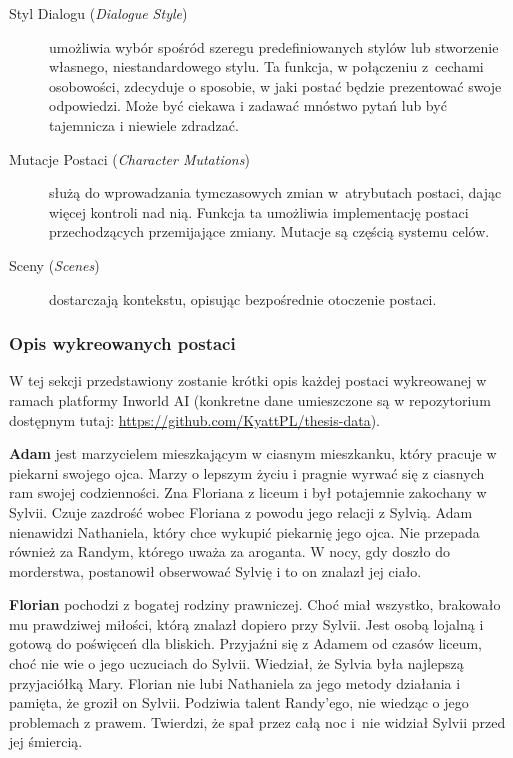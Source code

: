 \begin{description}
    \item[Styl Dialogu (\textit{Dialogue Style})] umożliwia wybór spośród szeregu predefiniowanych stylów lub stworzenie
          własnego, niestandardowego stylu. Ta funkcja, w połączeniu z~cechami osobowości, zdecyduje o
          sposobie, w jaki postać będzie prezentować swoje odpowiedzi. Może być ciekawa i zadawać mnóstwo pytań
          lub być tajemnicza i niewiele zdradzać\cite{inworld_docs}.

    \item[Mutacje Postaci (\textit{Character Mutations})] służą do wprowadzania tymczasowych zmian w~atrybutach
          postaci, dając więcej kontroli nad nią. Funkcja ta umożliwia implementację postaci przechodzących
          przemijające zmiany. Mutacje są częścią systemu celów\cite{inworld_docs}.

    \item[Sceny (\textit{Scenes})] dostarczają kontekstu, opisując bezpośrednie otoczenie postaci\cite{inworld_docs}.

\end{description}

\subsubsection*{Opis wykreowanych postaci}

W tej sekcji przedstawiony zostanie krótki opis każdej postaci wykreowanej w ramach platformy Inworld AI
(konkretne dane umieszczone są w repozytorium dostępnym tutaj: \href{https://github.com/KyattPL/thesis-data}{https://github.com/KyattPL/thesis-data}).

\textbf{Adam} jest marzycielem mieszkającym w ciasnym mieszkanku, który pracuje w piekarni swojego ojca.
Marzy o lepszym życiu i pragnie wyrwać się z ciasnych ram swojej codzienności. Zna Floriana z liceum i był
potajemnie zakochany w Sylvii. Czuje zazdrość wobec Floriana z powodu jego relacji z Sylvią.
Adam nienawidzi Nathaniela, który chce wykupić piekarnię jego ojca. Nie przepada również za
Randym, którego uważa za aroganta. W nocy, gdy doszło do morderstwa, postanowił obserwować Sylvię
i to on znalazł jej ciało.

\textbf{Florian} pochodzi z bogatej rodziny prawniczej. Choć miał wszystko, brakowało mu prawdziwej miłości,
którą znalazł dopiero przy Sylvii. Jest osobą lojalną i gotową do poświęceń dla bliskich. Przyjaźni
się z Adamem od czasów liceum, choć nie wie o jego uczuciach do Sylvii. Wiedział, że Sylvia
była najlepszą przyjaciółką Mary. Florian nie lubi Nathaniela za jego metody działania i pamięta, że groził
on Sylvii. Podziwia talent Randy'ego, nie wiedząc o jego problemach z prawem. Twierdzi, że spał przez całą
noc i~nie widział Sylvii przed jej śmiercią.

